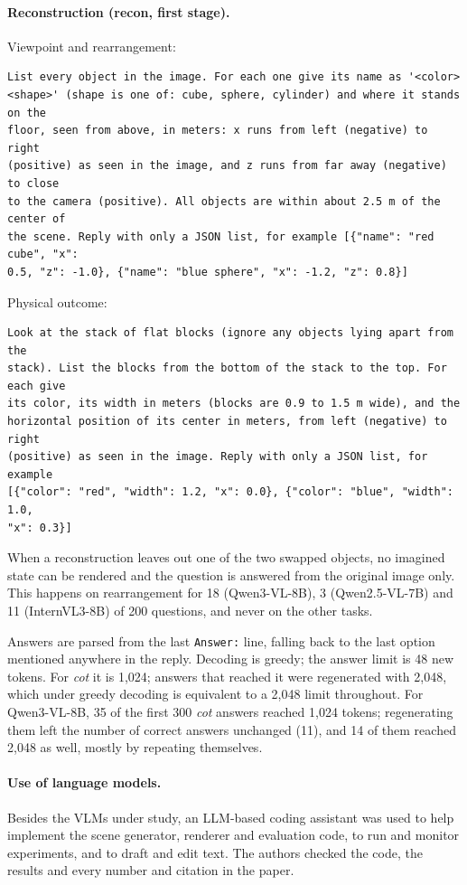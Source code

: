 \paragraph{Reconstruction (recon, first stage).} Viewpoint and rearrangement:
\begingroup\footnotesize\begin{verbatim}
List every object in the image. For each one give its name as '<color>
<shape>' (shape is one of: cube, sphere, cylinder) and where it stands on the
floor, seen from above, in meters: x runs from left (negative) to right
(positive) as seen in the image, and z runs from far away (negative) to close
to the camera (positive). All objects are within about 2.5 m of the center of
the scene. Reply with only a JSON list, for example [{"name": "red cube", "x":
0.5, "z": -1.0}, {"name": "blue sphere", "x": -1.2, "z": 0.8}]
\end{verbatim}
\endgroup
Physical outcome:
\begingroup\footnotesize\begin{verbatim}
Look at the stack of flat blocks (ignore any objects lying apart from the
stack). List the blocks from the bottom of the stack to the top. For each give
its color, its width in meters (blocks are 0.9 to 1.5 m wide), and the
horizontal position of its center in meters, from left (negative) to right
(positive) as seen in the image. Reply with only a JSON list, for example
[{"color": "red", "width": 1.2, "x": 0.0}, {"color": "blue", "width": 1.0,
"x": 0.3}]
\end{verbatim}
\endgroup
When a reconstruction leaves out one of the two swapped objects, no imagined state can be rendered and the question is answered from the original image only. This happens on rearrangement for 18 (Qwen3-VL-8B), 3 (Qwen2.5-VL-7B) and 11 (InternVL3-8B) of 200 questions, and never on the other tasks.

Answers are parsed from the last \texttt{Answer:} line, falling back to the last option mentioned anywhere in the reply. Decoding is greedy; the answer limit is 48 new tokens. For \emph{cot} it is 1{,}024; answers that reached it were regenerated with 2{,}048, which under greedy decoding is equivalent to a 2{,}048 limit throughout. For Qwen3-VL-8B, 35 of the first 300 \emph{cot} answers reached 1{,}024 tokens; regenerating them left the number of correct answers unchanged (11), and 14 of them reached 2{,}048 as well, mostly by repeating themselves.

\paragraph{Use of language models.} Besides the VLMs under study, an LLM-based coding assistant was used to help implement the scene generator, renderer and evaluation code, to run and monitor experiments, and to draft and edit text. The authors checked the code, the results and every number and citation in the paper.

